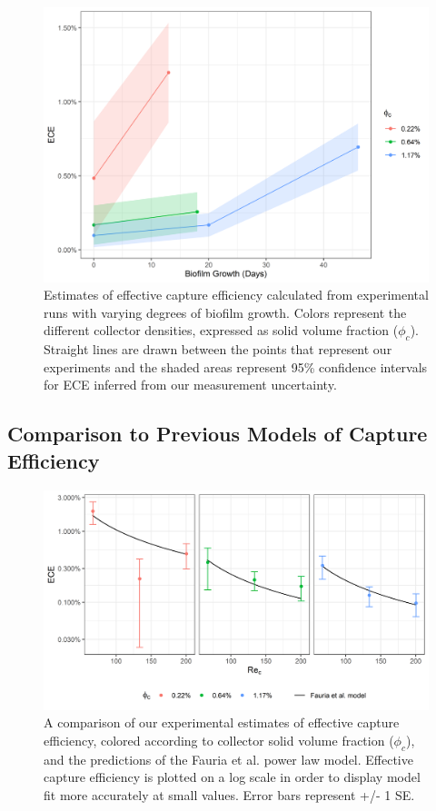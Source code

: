 \documentclass[geosciences,article,submit,moreauthors,pdftex]{Definitions/mdpi}
\begin{document}
\begin{figure}[H]
\centering
\includegraphics[width=5in]{../pics/biofilm.png}
\caption{Estimates of effective capture efficiency calculated from experimental runs with varying degrees of biofilm growth. Colors represent the different collector densities, expressed as solid volume fraction ($\phi_c$). Straight lines are drawn between the points that represent our experiments and the shaded areas represent 95\% confidence intervals for ECE inferred from our measurement uncertainty.}
\label{fig:biofilm}
\end{figure}   

\subsection{Comparison to Previous Models of Capture Efficiency}

\begin{figure}[H]
\centering
\includegraphics[width=5in]{../pics/comparisonplot.png}
\caption{A comparison of our experimental estimates of effective capture efficiency, colored according to collector solid volume fraction ($\phi_c$), and the predictions of the Fauria et al. \cite{Fauria_2015} power law model. Effective capture efficiency is plotted on a log scale in order to display model fit more accurately at small values. Error bars represent +/- 1 SE.}
\label{fig:compplot}
\end{figure}   
\end{document}
